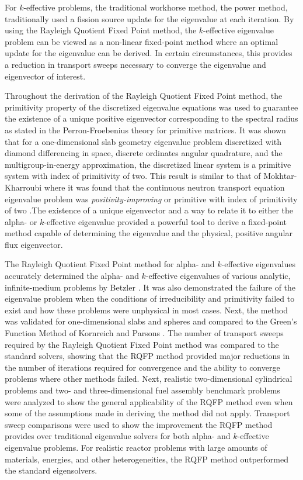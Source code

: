 For $k$-effective problems, the traditional workhorse method, the power method, traditionally used a fission source update for the eigenvalue at each iteration. By using the Rayleigh Quotient Fixed Point method, the $k$-effective eigenvalue problem can be viewed as a non-linear fixed-point method where an optimal update for the eigenvalue can be derived. In certain circumstances, this provides a reduction in transport sweeps necessary to converge the eigenvalue and eigenvector of interest.

Throughout the derivation of the Rayleigh Quotient Fixed Point method, the primitivity property of the discretized eigenvalue equations was used to guarantee the existence of a unique positive eigenvector corresponding to the spectral radius as stated in the Perron-Froebenius theory for primitive matrices. It was shown that for a one-dimensional slab geometry eigenvalue problem discretized with diamond differencing in space, discrete ordinates angular quadrature, and the multigroup-in-energy approximation, the discretized linear system is a primitive system with index of primitivity of two. This result is similar to that of Mokhtar-Kharroubi where it was found that the continuous neutron transport equation eigenvalue problem was \textit{positivity-improving} or primitive with index of primitivity of two \cite{mokhtar1997mathematical}.The existence of a unique eigenvector and a way to relate it to either the alpha- or $k$-effective eigenvalue provided a powerful tool to derive a fixed-point method capable of determining the eigenvalue and the physical, positive angular flux eigenvector.

The Rayleigh Quotient Fixed Point method for alpha- and $k$-effective eigenvalues accurately determined the alpha- and $k$-effective eigenvalues of various analytic, infinite-medium problems by Betzler \cite{Betzler2014Alpha}. It was also demonstrated the failure of the eigenvalue problem when the conditions of irreducibility and primitivity failed to exist and how these problems were unphysical in most cases. Next, the method was validated for one-dimensional slabs and spheres and compared to the Green's Function Method of Kornreich and Parsons \cite{kornreich_timeeigenvalue_2005}. The number of transport sweeps required by the Rayleigh Quotient Fixed Point method was compared to the standard solvers, showing that the RQFP method provided major reductions in the number of iterations required for convergence and the ability to converge problems where other methods failed. Next, realistic two-dimensional cylindrical problems and two- and three-dimensional fuel assembly benchmark problems were analyzed to show the general applicability of the RQFP method even when some of the assumptions made in deriving the method did not apply. Transport sweep comparisons were used to show the improvement the RQFP method provides over traditional eigenvalue solvers for both alpha- and $k$-effective eigenvalue problems. For realistic reactor problems with large amounts of materials, energies, and other heterogeneities, the RQFP method outperformed the standard eigensolvers.

